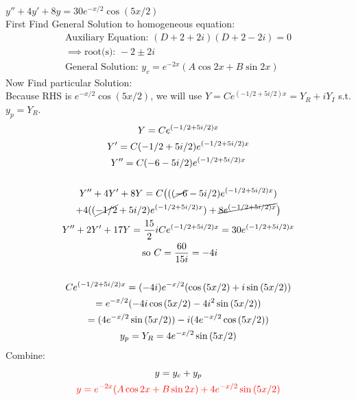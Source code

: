 \item [20.] $y''+4y'+8y=30e^{-x/2}\cos{(5x/2)}$\\[2mm]
First Find General Solution to homogeneous equation:
\begin{gather*}
    \text{Auxiliary Equation: } (D+2+2i)(D+2-2i)=0\\
    \implies \text{root(s): } -2\pm 2i\\
    \text{General Solution: } y_c=e^{-2x}(A\cos{2x}+B\sin{2x})
\end{gather*}
Now Find particular Solution:\\
Because RHS is $e^{-x/2}\cos{(5x/2)}$, we will use $Y=Ce^{(-1/2+5i/2)x}=Y_R+iY_I$ s.t. $y_p=Y_R$.
\begin{gather*}
    Y=Ce^{(-1/2+5i/2)x}\\
    Y'=C(-1/2+5i/2)e^{(-1/2+5i/2)x}\\
    Y''=C(-6-5i/2)e^{(-1/2+5i/2)x}\\\:\\
    Y''+4Y'+8Y = C
    \big(
    ((\cancel{-6}-5i/2)e^{(-1/2+5i/2)x})\\
    +4((\cancel{-1/2}+5i/2)e^{(-1/2+5i/2)x})
    +\cancel{8e^{(-1/2+5i/2)x}}
    \big)\\
    Y''+2Y'+17Y=\frac{15}{2}iCe^{(-1/2+5i/2)x}=30e^{(-1/2+5i/2)x}\\
    \text{ so } C=\frac{60}{15i}=-4i\\\:\\
    Ce^{(-1/2+5i/2)x}=(-4i)e^{-x/2}(\cos{(5x/2)}+i\sin{(5x/2)})\\
    =e^{-x/2}(-4i\cos{(5x/2)}-4i^2\sin{(5x/2)})\\
    =(4e^{-x/2}\sin{(5x/2)})-i(4e^{-x/2}\cos{(5x/2)})\\
    y_p = Y_R = 4e^{-x/2}\sin{(5x/2)}
\end{gather*}
Combine:
\begin{gather*}
    y=y_c+y_p\\
    \textcolor{red}{y = e^{-2x}(A\cos{2x}+B\sin{2x})+4e^{-x/2}\sin{(5x/2)}}
\end{gather*}